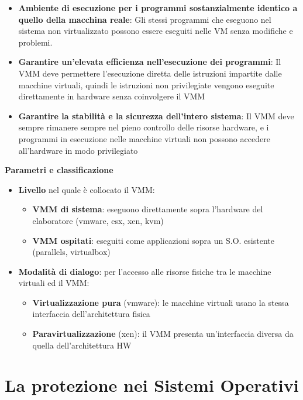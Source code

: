 \documentclass{article}
\begin{document}
\begin{itemize}
    \item \textbf{Ambiente di esecuzione per i programmi sostanzialmente identico a quello della macchina reale}: Gli stessi programmi che eseguono nel sistema non virtualizzato possono essere eseguiti nelle VM
    senza modifiche e problemi.
    \item \textbf{Garantire un'elevata efficienza nell'esecuzione dei programmi}: Il VMM deve permettere l'esecuzione diretta delle istruzioni impartite dalle macchine virtuali, quindi le istruzioni non 
    privilegiate vengono eseguite direttamente in hardware senza coinvolgere il VMM
    \item \textbf{Garantire la stabilità e la sicurezza dell'intero sistema}: Il VMM deve sempre rimanere sempre nel pieno controllo delle risorse hardware, e i programmi in  esecuzione nelle macchine virtuali non possono 
    accedere all'hardware in modo privilegiato
\end{itemize}

\textbf{Parametri e classificazione}
\begin{itemize}
    \item \textbf{Livello} nel quale è collocato il VMM:
    \begin{itemize}
        \item \textbf{VMM di sistema}: eseguono direttamente sopra l'hardware del elaboratore (vmware, esx, xen, kvm)
        \item \textbf{VMM ospitati}: eseguiti come applicazioni sopra un S.O. esistente (parallels, virtualbox)
    \end{itemize}
    \item \textbf{Modalità di dialogo}: per l'accesso alle risorse fisiche tra le macchine virtuali ed il VMM:
    \begin{itemize}
        \item \textbf{Virtualizzazione pura} (vmware): le macchine virtuali usano la stessa interfaccia dell'architettura fisica
        \item \textbf{Paravirtualizzazione} (xen): il VMM presenta un'interfaccia diversa da quella dell'architettura HW
    \end{itemize}
\end{itemize}




\section{La protezione nei Sistemi Operativi}
\end{document}
